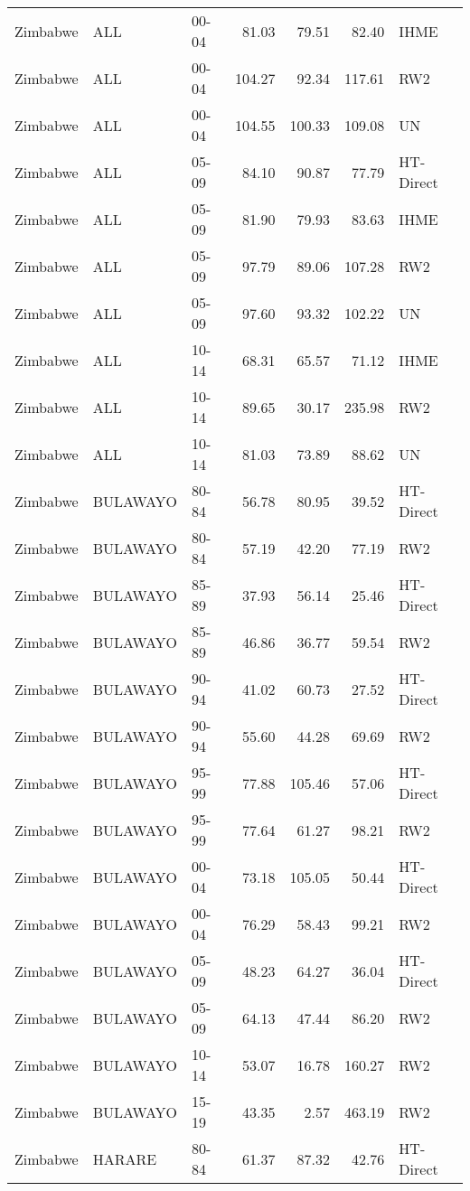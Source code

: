 \begin{longtable}{lllrrrl}
  Zimbabwe & ALL & 00-04 & 81.03 & 79.51 & 82.40 & IHME \\ 
  Zimbabwe & ALL & 00-04 & 104.27 & 92.34 & 117.61 & RW2 \\ 
  Zimbabwe & ALL & 00-04 & 104.55 & 100.33 & 109.08 & UN \\ 
  Zimbabwe & ALL & 05-09 & 84.10 & 90.87 & 77.79 & HT-Direct \\ 
  Zimbabwe & ALL & 05-09 & 81.90 & 79.93 & 83.63 & IHME \\ 
  Zimbabwe & ALL & 05-09 & 97.79 & 89.06 & 107.28 & RW2 \\ 
  Zimbabwe & ALL & 05-09 & 97.60 & 93.32 & 102.22 & UN \\ 
  Zimbabwe & ALL & 10-14 & 68.31 & 65.57 & 71.12 & IHME \\ 
  Zimbabwe & ALL & 10-14 & 89.65 & 30.17 & 235.98 & RW2 \\ 
  Zimbabwe & ALL & 10-14 & 81.03 & 73.89 & 88.62 & UN \\ 
  Zimbabwe & BULAWAYO & 80-84 & 56.78 & 80.95 & 39.52 & HT-Direct \\ 
  Zimbabwe & BULAWAYO & 80-84 & 57.19 & 42.20 & 77.19 & RW2 \\ 
  Zimbabwe & BULAWAYO & 85-89 & 37.93 & 56.14 & 25.46 & HT-Direct \\ 
  Zimbabwe & BULAWAYO & 85-89 & 46.86 & 36.77 & 59.54 & RW2 \\ 
  Zimbabwe & BULAWAYO & 90-94 & 41.02 & 60.73 & 27.52 & HT-Direct \\ 
  Zimbabwe & BULAWAYO & 90-94 & 55.60 & 44.28 & 69.69 & RW2 \\ 
  Zimbabwe & BULAWAYO & 95-99 & 77.88 & 105.46 & 57.06 & HT-Direct \\ 
  Zimbabwe & BULAWAYO & 95-99 & 77.64 & 61.27 & 98.21 & RW2 \\ 
  Zimbabwe & BULAWAYO & 00-04 & 73.18 & 105.05 & 50.44 & HT-Direct \\ 
  Zimbabwe & BULAWAYO & 00-04 & 76.29 & 58.43 & 99.21 & RW2 \\ 
  Zimbabwe & BULAWAYO & 05-09 & 48.23 & 64.27 & 36.04 & HT-Direct \\ 
  Zimbabwe & BULAWAYO & 05-09 & 64.13 & 47.44 & 86.20 & RW2 \\ 
  Zimbabwe & BULAWAYO & 10-14 & 53.07 & 16.78 & 160.27 & RW2 \\ 
  Zimbabwe & BULAWAYO & 15-19 & 43.35 & 2.57 & 463.19 & RW2 \\ 
  Zimbabwe & HARARE & 80-84 & 61.37 & 87.32 & 42.76 & HT-Direct \\ 

\end{longtable}
